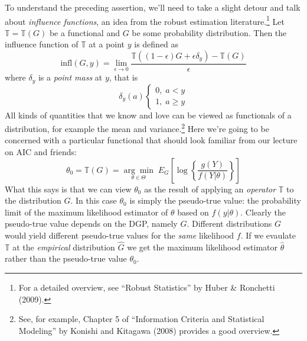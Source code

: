 To understand the preceding assertion, we'll need to take a slight detour and talk about \emph{influence functions}, an idea from the robust estimation literature.\footnote{For a detailed overview, see ``Robust Statistics'' by Huber \& Ronchetti (2009).} 
Let $\mathbb{T}=\mathbb{T}(G)$ be a functional and $G$ be some probability distribution. 
Then the influence function of $\mathbb{T}$ at a point $y$ is defined as 
	$$\mbox{infl}(G,y) = \lim_{\epsilon \rightarrow 0} \frac{\mathbb{T}\left(\left(1-\epsilon\right)G + \epsilon \delta_y\right) - \mathbb{T}(G)}{\epsilon}$$
where $\delta_y$ is a \emph{point mass} at $y$, that is
		$$\delta_y(a)\left\{\begin{array}{c} 0, \; a<y \\ 1, \; a\geq y\end{array} \right.$$
All kinds of quantities that we know and love can be viewed as functionals of a distribution, for example the mean and variance.\footnote{See, for example, Chapter 5 of ``Information Criteria and Statistical Modeling'' by Konishi and Kitagawa (2008) provides a good overview.} 
Here we're going to be concerned with a particular functional that should look familiar from our lecture on AIC and friends:
	$$\theta_0 = \mathbb{T}(G) = \underset{\theta \in \Theta}{\arg \min} \;E_G\left[\log\left\{\frac{g(Y)}{f(Y|\theta)} \right\} \right]$$
What this says is that we can view $\theta_0$ as the result of applying an \emph{operator} $\mathbb{T}$ to the distribution $G$. 
In this case $\theta_0$ is simply the pseudo-true value: the probability limit of the maximum likelihood estimator of $\theta$ based on $f(y|\theta)$. 
Clearly the pseudo-true value depends on the DGP, namely $G$. 
Different distributions $G$ would yield different pseudo-true values for the \emph{same} likelihood $f$. 
If we evaulate $\mathbb{T}$ at the \emph{empirical} distribution $\widehat{G}$ we get the maximum likelihood estimator $\widehat{\theta}$ rather than the pseudo-true value $\theta_0$.


